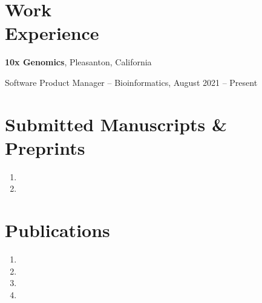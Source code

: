 \documentclass[margin,centered]{res}
\newenvironment{list1}{
  \begin{list}{\ding{113}}{%
      \setlength{\itemsep}{0in}
      \setlength{\parsep}{0in} \setlength{\parskip}{0in}
      \setlength{\topsep}{0in} \setlength{\partopsep}{0in}
      \setlength{\leftmargin}{0.17in}}}{\end{list}}
\begin{document}
\begin{resume}
\section{\sc Work\\ Experience}
{\bf 10x Genomics},  Pleasanton, California
\begin{list1}
\item[] 
Software Product Manager -- Bioinformatics, August 2021 -- Present
\end{list1}



\section{\sc Submitted Manuscripts \& Preprints}


\begin{enumerate}[leftmargin=*]
\item {}
\item {}
\end{enumerate}

\section{\sc Publications}
\begin{enumerate}[leftmargin=*]
\item {}
\item {}
\item {}
\item {}
\end{enumerate}






\end{resume}
\end{document}
